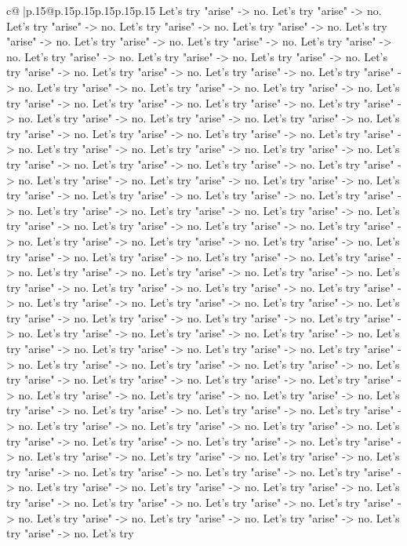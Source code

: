 \documentclass{article}
\begin{document}
{\begin{supertabular}{c@{$\;$}|p{.15\linewidth}@{}p{.15\linewidth}p{.15\linewidth}p{.15\linewidth}p{.15\linewidth}p{.15\linewidth}}
{{{Let's try "arise" {-}> no. Let's try "arise" {-}> no. Let's try "arise" {-}> no. Let's try "arise" {-}> no. Let's try "arise" {-}> no. Let's try "arise" {-}> no. Let's try "arise" {-}> no. Let's try "arise" {-}> no. Let's try "arise" {-}> no. Let's try "arise" {-}> no. Let's try "arise" {-}> no. Let's try "arise" {-}> no. Let's try "arise" {-}> no. Let's try "arise" {-}> no. Let's try "arise" {-}> no. Let's try "arise" {-}> no. Let's try "arise" {-}> no. Let's try "arise" {-}> no. Let's try "arise" {-}> no. Let's try "arise" {-}> no. Let's try "arise" {-}> no. Let's try "arise" {-}> no. Let's try "arise" {-}> no. Let's try "arise" {-}> no. Let's try "arise" {-}> no. Let's try "arise" {-}> no. Let's try "arise" {-}> no. Let's try "arise" {-}> no. Let's try "arise" {-}> no. Let's try "arise" {-}> no. Let's try "arise" {-}> no. Let's try "arise" {-}> no. Let's try "arise" {-}> no. Let's try "arise" {-}> no. Let's try "arise" {-}> no. Let's try "arise" {-}> no. Let's try "arise" {-}> no. Let's try "arise" {-}> no. Let's try "arise" {-}> no. Let's try "arise" {-}> no. Let's try "arise" {-}> no. Let's try "arise" {-}> no. Let's try "arise" {-}> no. Let's try "arise" {-}> no. Let's try "arise" {-}> no. Let's try "arise" {-}> no. Let's try "arise" {-}> no. Let's try "arise" {-}> no. Let's try "arise" {-}> no. Let's try "arise" {-}> no. Let's try "arise" {-}> no. Let's try "arise" {-}> no. Let's try "arise" {-}> no. Let's try "arise" {-}> no. Let's try "arise" {-}> no. Let's try "arise" {-}> no. Let's try "arise" {-}> no. Let's try "arise" {-}> no. Let's try "arise" {-}> no. Let's try "arise" {-}> no. Let's try "arise" {-}> no. Let's try "arise" {-}> no. Let's try "arise" {-}> no. Let's try "arise" {-}> no. Let's try "arise" {-}> no. Let's try "arise" {-}> no. Let's try "arise" {-}> no. Let's try "arise" {-}> no. Let's try "arise" {-}> no. Let's try "arise" {-}> no. Let's try "arise" {-}> no. Let's try "arise" {-}> no. Let's try "arise" {-}> no. Let's try "arise" {-}> no. Let's try "arise" {-}> no. Let's try "arise" {-}> no. Let's try "arise" {-}> no. Let's try "arise" {-}> no. Let's try "arise" {-}> no. Let's try "arise" {-}> no. Let's try "arise" {-}> no. Let's try "arise" {-}> no. Let's try "arise" {-}> no. Let's try "arise" {-}> no. Let's try "arise" {-}> no. Let's try "arise" {-}> no. Let's try "arise" {-}> no. Let's try "arise" {-}> no. Let's try "arise" {-}> no. Let's try "arise" {-}> no. Let's try "arise" {-}> no. Let's try "arise" {-}> no. Let's try "arise" {-}> no. Let's try "arise" {-}> no. Let's try "arise" {-}> no. Let's try "arise" {-}> no. Let's try "arise" {-}> no. Let's try "arise" {-}> no. Let's try "arise" {-}> no. Let's try "arise" {-}> no. Let's try "arise" {-}> no. Let's try "arise" {-}> no. Let's try "arise" {-}> no. Let's try "arise" {-}> no. Let's try "arise" {-}> no. Let's try "arise" {-}> no. Let's try "arise" {-}> no. Let's try "arise" {-}> no. Let's try "arise" {-}> no. Let's try "arise" {-}> no. Let's try "arise" {-}> no. Let's try "arise" {-}> no. Let's try "arise" {-}> no. Let's try "arise" {-}> no. Let's try "arise" {-}> no. Let's try "arise" {-}> no. Let's try "arise" {-}> no. Let's try "arise" {-}> no. Let's try }}}
\end{supertabular}}
\end{document}
